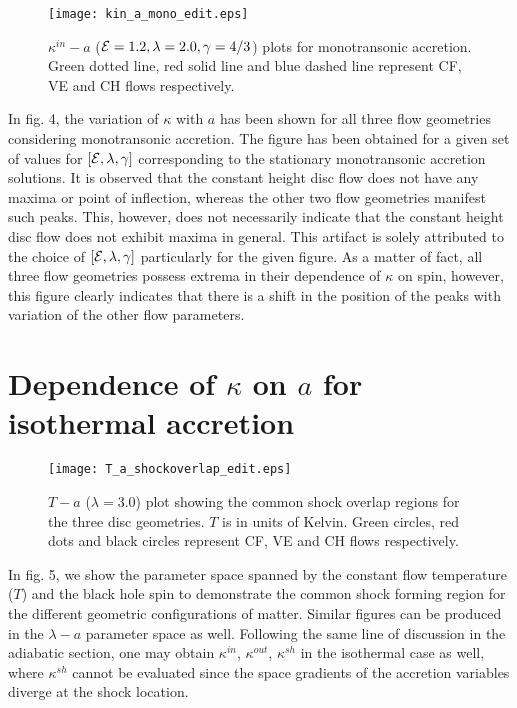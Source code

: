 \documentclass[10pt,authoryear]{article}
\begin{document}
\begin{figure}[h!]
\centering
\texttt{[image: kin\_a\_mono\_edit.eps]}
\caption{$\kappa^{in} - a$ (${\cal E}=1.2,\lambda=2.0,\gamma=4/3$) plots for monotransonic accretion. 
Green dotted line, red solid line and blue dashed line represent CF, VE and CH flows respectively.}
\label{fig4}
\end{figure}

In fig. 4, the variation of $\kappa$ with $a$ has been shown for all three flow geometries 
considering monotransonic accretion. The figure has been obtained for a given set of values for $\left[{\cal E},\lambda,\gamma\right]$ corresponding 
to the stationary monotransonic accretion solutions. It is observed that the constant height disc flow does not have any maxima or point of inflection, 
whereas the other two flow geometries manifest such peaks. This, however, does not necessarily indicate that the constant height disc flow does not 
exhibit maxima in general. This artifact is solely attributed to the choice of $\left[{\cal E},\lambda,\gamma\right]$ particularly for the given figure. 
As a matter of fact, all three flow geometries possess extrema in their dependence of $\kappa$ on spin, however, this figure clearly indicates that there 
is a shift in the position of the peaks with variation of the other flow parameters.


\section{Dependence of $\kappa$ on $a$ for isothermal accretion}

\begin{figure}[h!]
\centering
\texttt{[image: T\_a\_shockoverlap\_edit.eps]}
\caption{$T - a$ ($\lambda=3.0$) plot showing the common shock overlap regions for 
the three disc geometries. $T$ is in units of Kelvin. Green circles, red dots and black circles 
represent CF, VE and CH flows respectively.}
\label{fig5}
\end{figure}

In fig. 5, we show the parameter space spanned by the constant flow temperature ($T$) and the black hole spin to demonstrate the common shock forming 
region for the different geometric configurations of matter. Similar figures can be produced in the $\lambda - a$ parameter space as well. Following the 
same line of discussion in the adiabatic section, one may obtain $\kappa^{in}$, $\kappa^{out}$, $\kappa^{sh}$ in the isothermal case as well, where $
\kappa^{sh}$ cannot be evaluated since the space gradients of the accretion variables diverge at the shock location. 
\end{document}
